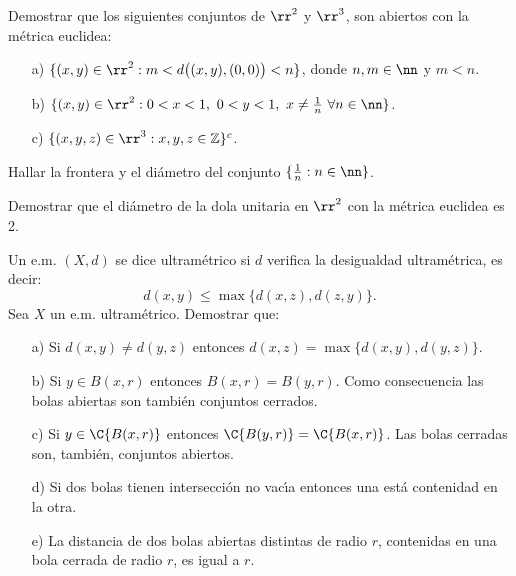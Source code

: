 \begin{ejercicio} Demostrar que los siguientes conjuntos de
$\rr^2$ y $\rr^3$, son abiertos con la m\'etrica euclidea:
\begin{itemize}
\item[a)] $\{(x,y)\in\rr^2: m<d\bigl((x,y),(0,0)\bigr)<n\}$, donde
$n,m\in\nn$ y $m<n$.
\item[b)] $\{(x,y)\in\rr^2: 0<x<1,\,\, 0<y<1,\,\,x\neq
\frac1n\,\,\forall n\in\nn\}$.
\item[c)] $\{(x,y,z)\in\rr^3: x,y,z\in\mathbb{Z}\}^c$.
\end{itemize}
\end{ejercicio}
\begin{ejercicio} Hallar la frontera y el di\'ametro del conjunto
$\{\frac1n:n\in\nn\}$.
\end{ejercicio}
\begin{ejercicio} Demostrar que el di\'ametro de la dola unitaria
en $\rr^2$ con la m\'etrica euclidea es 2.
\end{ejercicio}
\begin{ejercicio} Un e.m. $(X,d)$ se dice ultram\'etrico si $d$ verifica la
desigualdad ultram\'etrica, es decir:
\[
	d(x,y)\leq\max\{d(x,z),d(z,y)\}.
\]
Sea $X$ un e.m. ultram\'etrico. Demostrar que:
\begin{itemize}
\item[a)] Si $d(x,y)\neq d(y,z)$ entonces
$d(x,z)=\max\{d(x,y),d(y,z)\}$.
\item[b)] Si $y\in B(x,r)$ entonces $B(x,r)=B(y,r)$. Como
consecuencia las bolas abiertas son tambi\'en conjuntos cerrados.
\item[c)] Si $y\in\C{B(x,r)}$ entonces $\C{B(y,r)}=\C{B(x,r)}$.
Las bolas cerradas son, tambi\'en, conjuntos abiertos.

\item[d)] Si dos bolas tienen intersecci\'on no vac\'{\i}a
entonces una est\'a  contenidad en la otra.

\item[e)] La distancia de dos bolas abiertas distintas de radio
$r$, contenidas en una bola cerrada de radio $r$, es igual a $r$.
\end{itemize}
\end{ejercicio}

